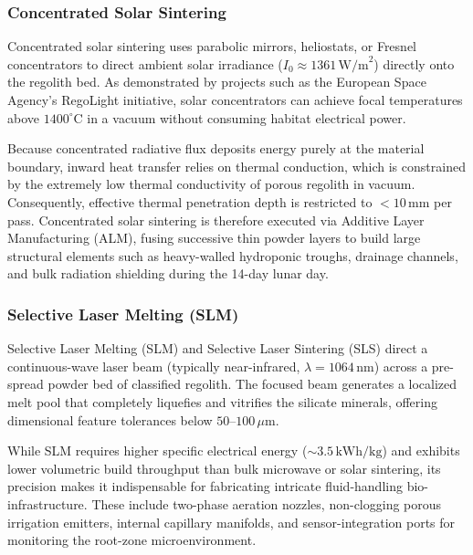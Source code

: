 \subsubsection{Concentrated Solar Sintering}
Concentrated solar sintering uses parabolic mirrors, heliostats, or Fresnel concentrators to direct ambient solar irradiance ($I_0 \approx 1361\,\mathrm{W/m}^2$) directly onto the regolith bed\cite{ming1989lunar,fateri2019solar}. As demonstrated by projects such as the European Space Agency's RegoLight initiative, solar concentrators can achieve focal temperatures above $1400^\circ\mathrm{C}$ in a vacuum without consuming habitat electrical power\cite{ming1989lunar,fateri2019solar,meurisse2018regolight,meurisse2018solar}.

Because concentrated radiative flux deposits energy purely at the material boundary, inward heat transfer relies on thermal conduction, which is constrained by the extremely low thermal conductivity of porous regolith in vacuum\cite{xi2026multiphysics,lim2019numerical}. Consequently, effective thermal penetration depth is restricted to $<10\,\mathrm{mm}$ per pass\cite{xi2026multiphysics}. Concentrated solar sintering is therefore executed via Additive Layer Manufacturing (ALM), fusing successive thin powder layers to build large structural elements such as heavy-walled hydroponic troughs, drainage channels, and bulk radiation shielding during the 14-day lunar day\cite{ming1989lunar,meurisse2018regolight,fateri2019investigation}.

\subsubsection{Selective Laser Melting (SLM)}
Selective Laser Melting (SLM) and Selective Laser Sintering (SLS) direct a continuous-wave laser beam (typically near-infrared, $\lambda = 1064\,\mathrm{nm}$) across a pre-spread powder bed of classified regolith\cite{ming1989lunar,goulas2017process,goulas2024selective}. The focused beam generates a localized melt pool that completely liquefies and vitrifies the silicate minerals, offering dimensional feature tolerances below $50\text{--}100\,\mu\mathrm{m}$\cite{xi2026multiphysics,goulas2017process}.

While SLM requires higher specific electrical energy ($\sim 3.5\,\mathrm{kWh/kg}$) and exhibits lower volumetric build throughput than bulk microwave or solar sintering, its precision makes it indispensable for fabricating intricate fluid-handling bio-infrastructure\cite{ming1989lunar,goulas2017process}. These include two-phase aeration nozzles, non-clogging porous irrigation emitters, internal capillary manifolds, and sensor-integration ports for monitoring the root-zone microenvironment\cite{ming1989lunar,goulas2017process,balla2012first}.

